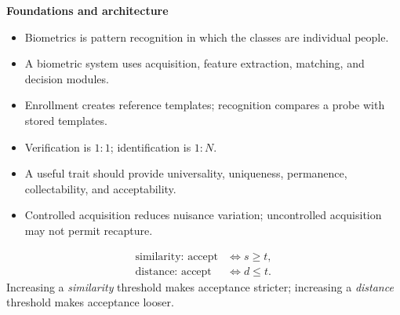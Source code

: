 \documentclass[11pt,a4paper,oneside]{report}
\begin{document}
\begingroup
\normalsize
\raggedright
{}
\noindent\begin{minipage}[t]{0.485\textwidth}
\vspace{0pt}
\begin{keyconcept}
\textbf{Foundations and architecture}
\begin{itemize}[leftmargin=*,itemsep=0.18em,topsep=0.25em]
    \item Biometrics is pattern recognition in which the classes are individual people.
    \item A biometric system uses acquisition, feature extraction, matching, and decision modules.
    \item Enrollment creates reference templates; recognition compares a probe with stored templates.
    \item Verification is \(1{:}1\); identification is \(1{:}N\).
    \item A useful trait should provide universality, uniqueness, permanence, collectability, and acceptability.
    \item Controlled acquisition reduces nuisance variation; uncontrolled acquisition may not permit recapture.
\end{itemize}
\end{keyconcept}

\begin{remarkbox}
\[
\begin{aligned}
\text{similarity: accept} &\iff s\ge t,\\
\text{distance: accept} &\iff d\le t.
\end{aligned}
\]
Increasing a \emph{similarity} threshold makes acceptance stricter; increasing a
\emph{distance} threshold makes acceptance looser.
\end{remarkbox}

\end{minipage}\hfill
\end{document}

